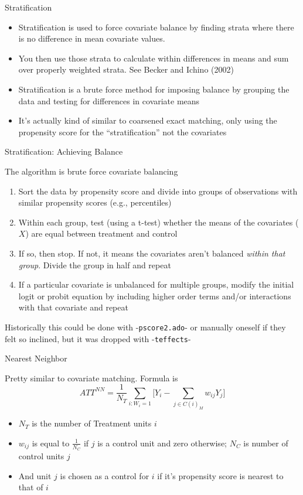 \documentclass{beamer}
\begin{document}
\begin{frame}{Stratification}
	
	\begin{itemize}
	\item Stratification is used to force covariate balance by finding strata where there is no difference in mean covariate values. 
	\item You then use those strata to calculate within differences in means and sum over properly weighted strata. See Becker and Ichino (2002)
	\item  Stratification is a brute force method for imposing balance by grouping the data and testing for differences in covariate means
	\item It's actually kind of similar to coarsened exact matching, only using the propensity score for the ``stratification'' not the covariates
	\end{itemize}
	
\end{frame}


\begin{frame}{Stratification: Achieving Balance}
	
The algorithm is brute force covariate balancing
	\begin{enumerate}
		\item Sort the data by propensity score and divide into groups of observations with similar propensity scores (e.g., percentiles)
		\item Within each group, test (using a t-test) whether the means of the covariates ($X$) are equal between treatment and control
		\item If so, then stop.  If not, it means the covariates aren't balanced \emph{within that group}.  Divide the group in half and repeat
		\item If a particular covariate is unbalanced for multiple groups, modify the initial logit or probit equation by including higher order terms and/or interactions with that covariate and repeat
		\end{enumerate}
Historically this could be done with -\texttt{pscore2.ado}- or manually oneself if they felt so inclined, but it was dropped with -\texttt{teffects}-
\end{frame}


\begin{frame}{Nearest Neighbor}
	
	Pretty similar to covariate matching.  Formula is $$ATT^{NN} = \frac{1}{N_T} \sum_{i:W_i=1} \bigg [ Y_i - \sum_{j \in C(i)_M} w_{ij}Y_j \bigg ]$$ 
		\begin{itemize}
		\item $N_T$ is the number of Treatment units $i$
		\item $w_{ij}$ is equal to $\frac{1}{N_C}$ if $j$ is a control unit and zero otherwise; $N_C$ is number of control units $j$
		\item And unit $j$ is chosen as a control for $i$ if it's propensity score is nearest to that of $i$
		\end{itemize}
\end{frame}
\end{document}
